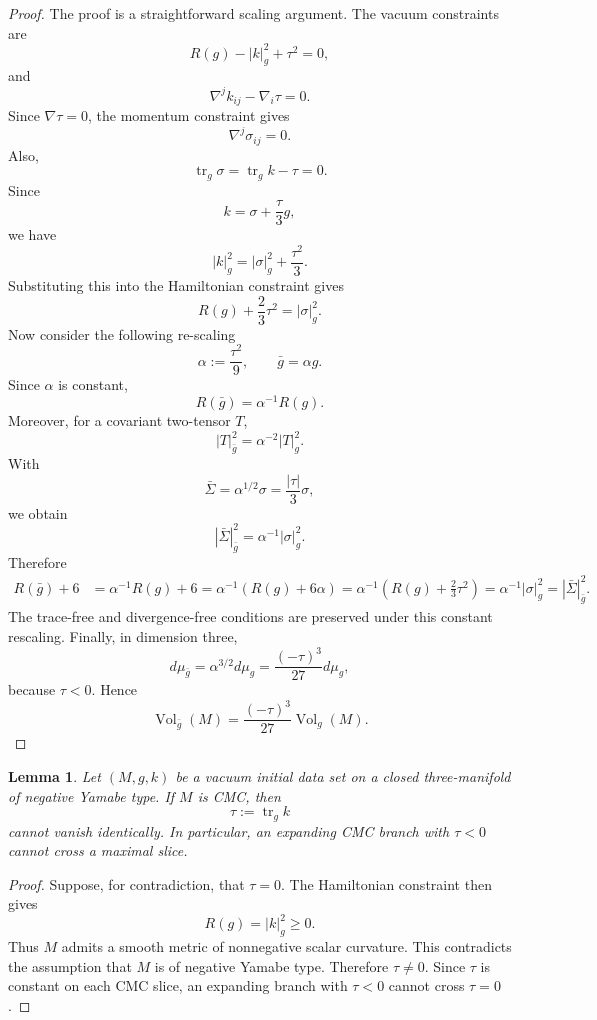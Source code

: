 \documentclass{amsart}
\newtheorem{lemma}{Lemma}[section]
\begin{document}
\begin{proof} The proof is a straightforward scaling argument.
The vacuum constraints are
\[
        R(g)-|k|_g^2+\tau^2=0,
\]
and
\[
        \nabla^j k_{ij}-\nabla_i\tau=0.
\]
Since \(\nabla\tau=0\), the momentum constraint gives
\[
        \nabla^j\sigma_{ij}=0.
\]
Also,
\[
        \operatorname{tr}_g\sigma
        =
        \operatorname{tr}_g k-\tau=0.
\]
Since
\[
        k=\sigma+\frac{\tau}{3}g,
\]
we have
\[
        |k|_g^2
        =
        |\sigma|_g^2+\frac{\tau^2}{3}.
\]
Substituting this into the Hamiltonian constraint gives
\[
        R(g)+\frac{2}{3}\tau^2=|\sigma|_g^2.
\]
Now consider the following re-scaling
\[
        \alpha:=\frac{\tau^2}{9},
        \qquad
        \bar g=\alpha g.
\]
Since \(\alpha\) is constant,
\[
        R(\bar g)=\alpha^{-1}R(g).
\]
Moreover, for a covariant two-tensor \(T\),
\[
        |T|_{\bar g}^2=\alpha^{-2}|T|_g^2.
\]
With
\[
        \bar\Sigma=\alpha^{1/2}\sigma
        =
        \frac{|\tau|}{3}\sigma,
\]
we obtain
\[
        |\bar\Sigma|_{\bar g}^2
        =
        \alpha^{-1}|\sigma|_g^2.
\]
Therefore
\[
\begin{aligned}
        R(\bar g)+6
        &=
        \alpha^{-1}R(g)+6        =
        \alpha^{-1}
        \left(
        R(g)+6\alpha
        \right)=                 
        \alpha^{-1}
        \left(
        R(g)+\frac{2}{3}\tau^2
        \right)                 =
        \alpha^{-1}|\sigma|_g^2
        =
        |\bar\Sigma|_{\bar g}^2.
\end{aligned}
\]
The trace-free and divergence-free conditions are preserved under this
constant rescaling.  Finally, in dimension three,
\[
        d\mu_{\bar g}
        =
        \alpha^{3/2}d\mu_g
        =
        \frac{(-\tau)^3}{27}d\mu_g,
\]
because \(\tau<0\).  Hence
\[
        \operatorname{Vol}_{\bar g}(M)
        =
        \frac{(-\tau)^3}{27}\operatorname{Vol}_{g}(M).
\]
\end{proof}

\begin{lemma}
\label{lem:no-maximal-slice}
Let \((M,g,k)\) be a vacuum initial data set on a closed three-manifold of
negative Yamabe type.  If \(M\) is CMC, then
\[
        \tau:=\operatorname{tr}_g k
\]
cannot vanish identically.  In particular, an expanding CMC branch with
\(\tau<0\) cannot cross a maximal slice.
\end{lemma}

\begin{proof}
Suppose, for contradiction, that \(\tau=0\).  The Hamiltonian constraint
then gives
\[
        R(g)=|k|_g^2\geq0.
\]
Thus \(M\) admits a smooth metric of nonnegative scalar curvature.  This
contradicts the assumption that \(M\) is of negative Yamabe type.  Therefore
\(\tau\neq0\).  Since \(\tau\) is constant on each CMC slice, an expanding
branch with \(\tau<0\) cannot cross \(\tau=0\).
\end{proof}
\end{document}
